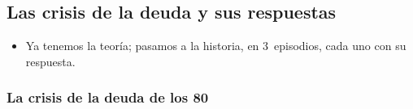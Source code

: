 \documentclass[11pt]{article}
\begin{document}
\subsection{Las crisis de la deuda y sus respuestas}\label{sec:crisis-deuda}

\begin{itemize}
\item Ya tenemos la teoría; pasamos a la historia, en 3~episodios, cada uno con su respuesta.
\end{itemize}

\subsubsection{La crisis de la deuda de los 80}\label{sec:crisis-80}
\end{document}
